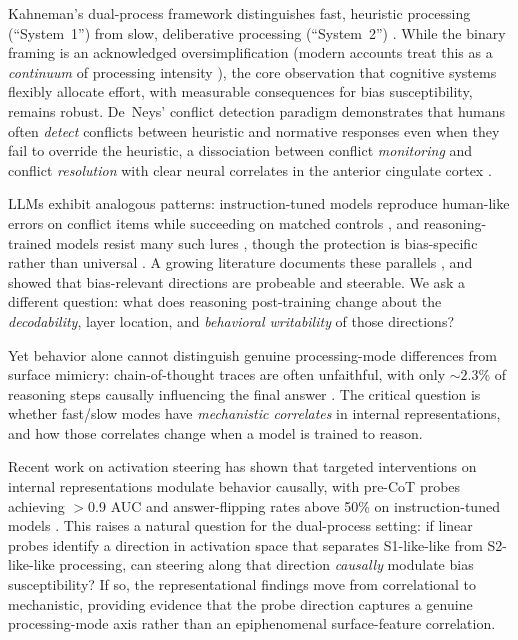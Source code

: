 \documentclass{article}
\newcommand{\sone}{S1-like}
\newcommand{\stwo}{S2-like}
\begin{document}
Kahneman's dual-process framework distinguishes fast, heuristic
processing (``System~1'') from slow, deliberative processing
(``System~2'') \citep{kahneman2011thinking}.  While the binary framing
is an acknowledged oversimplification (modern accounts treat this as a
\emph{continuum} of processing intensity \citep{melnikoff2018mythical,
evans2013dual, deneys2023advancing}), the core observation that
cognitive systems flexibly allocate effort, with measurable consequences
for bias susceptibility, remains robust.  De~Neys' conflict
detection paradigm \citep{deneys2012bias, deneys2017dual} demonstrates
that humans often \emph{detect} conflicts between heuristic and
normative responses even when they fail to override the heuristic, a
dissociation between conflict \emph{monitoring} and conflict
\emph{resolution} with clear neural correlates in the anterior cingulate
cortex \citep{botvinick2001conflict}.

LLMs exhibit analogous patterns: instruction-tuned models reproduce
human-like errors on conflict items while succeeding on matched controls
\citep{hagendorff2023human}, and reasoning-trained models resist many
such lures \citep{deepseekr1}, though the protection is bias-specific
rather than universal \citep{schwartz2025clinical}.  A growing literature
documents these parallels \citep{codaforno2025dual,
ziabari2025reasoning}, and \citet{huang2026cogbias} showed that
bias-relevant directions are probeable and steerable.  We ask a
different question: what does reasoning post-training change about the
\emph{decodability}, layer location, and \emph{behavioral writability}
of those directions?

Yet behavior alone cannot distinguish genuine processing-mode differences
from surface mimicry: chain-of-thought traces are often unfaithful,
with only ${\sim}2.3$\% of reasoning steps causally influencing the
final answer \citep{jiang2025aha, lanham2023measuring,
boppana2026reasoning}.  The critical question is whether fast/slow modes
have \emph{mechanistic correlates} in internal representations, and how
those correlates change when a model is trained to reason.

Recent work on activation steering \citep{turner2023activation,
rimsky2024steering, cox2026decoding} has shown that targeted
interventions on internal representations modulate behavior causally,
with pre-CoT probes achieving $>$0.9 AUC and answer-flipping rates
above 50\% on instruction-tuned models \citep{cox2026decoding}.  This raises a
natural question for the dual-process setting: if linear probes identify
a direction in activation space that separates \sone{}-like from
\stwo{}-like processing, can steering along that direction
\emph{causally} modulate bias susceptibility?  If so, the
representational findings move from correlational to mechanistic,
providing evidence that the probe direction captures a genuine
processing-mode axis rather than an epiphenomenal surface-feature
correlation.
\end{document}
